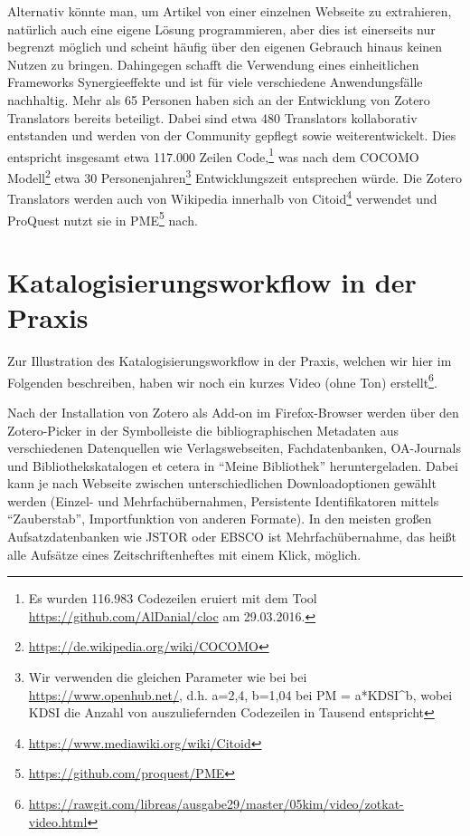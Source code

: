 \documentclass[a4paper,
fontsize=11pt,
oneside,
numbers=noperiodatend,
parskip=half-,
bibliography=totoc,
final
]{scrartcl}
\begin{document}
Alternativ könnte man, um Artikel von einer einzelnen Webseite zu
extrahieren, natürlich auch eine eigene Lösung programmieren, aber dies
ist einerseits nur begrenzt möglich und scheint häufig über den eigenen
Gebrauch hinaus keinen Nutzen zu bringen. Dahingegen schafft die
Verwendung eines einheitlichen Frameworks Synergieeffekte und ist für
viele verschiedene Anwendungsfälle nachhaltig. Mehr als 65 Personen
haben sich an der Entwicklung von Zotero Translators bereits beteiligt.
Dabei sind etwa 480 Translators kollaborativ entstanden und werden von
der Community gepflegt sowie weiterentwickelt. Dies entspricht insgesamt
etwa 117.000 Zeilen Code,\footnote{Es wurden 116.983 Codezeilen eruiert
  mit dem Tool \url{https://github.com/AlDanial/cloc} am 29.03.2016.}
was nach dem COCOMO Modell\footnote{\url{https://de.wikipedia.org/wiki/COCOMO}}
etwa 30 Personenjahren\footnote{Wir verwenden die gleichen Parameter wie
  bei bei \url{https://www.openhub.net/}, d.h. a=2,4, b=1,04 bei PM =
  a*KDSI\^{}b, wobei KDSI die Anzahl von auszuliefernden Codezeilen in
  Tausend entspricht} Entwicklungszeit entsprechen würde. Die Zotero
Translators werden auch von Wikipedia innerhalb von Citoid\footnote{\url{https://www.mediawiki.org/wiki/Citoid}}
verwendet und ProQuest nutzt sie in PME\footnote{\url{https://github.com/proquest/PME}}
nach.

\section*{Katalogisierungsworkflow in der
Praxis}\label{katalogisierungsworkflow-in-der-praxis}

Zur Illustration des Katalogisierungsworkflow in der Praxis, welchen wir
hier im Folgenden beschreiben, haben wir noch ein kurzes Video (ohne
Ton) erstellt\footnote{\url{https://rawgit.com/libreas/ausgabe29/master/05kim/video/zotkat-video.html}}.

Nach der Installation von Zotero als Add-on im Firefox-Browser werden
über den Zotero-Picker in der Symbolleiste die bibliographischen
Metadaten aus verschiedenen Datenquellen wie Verlagswebseiten,
Fachdatenbanken, OA-Journals und Bibliothekskatalogen et cetera in
\enquote{Meine Bibliothek} heruntergeladen. Dabei kann je nach Webseite
zwischen unterschiedlichen Downloadoptionen gewählt werden (Einzel- und
Mehrfachübernahmen, Persistente Identifikatoren mittels
\enquote{Zauberstab}, Im\-portfunktion von anderen Formate). In den
meisten großen Aufsatzdatenbanken wie JSTOR oder EBSCO ist
Mehrfachübernahme, das heißt alle Aufsätze eines Zeitschriftenheftes mit
einem Klick, möglich.
\end{document}

